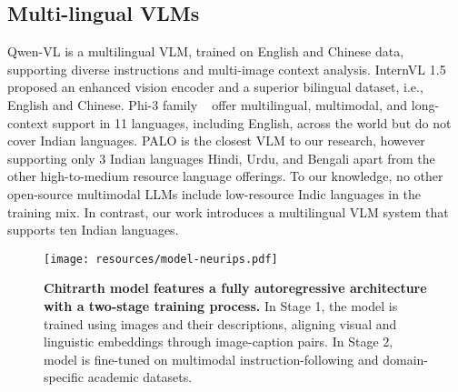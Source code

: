 \subsection{Multi-lingual VLMs}
Qwen-VL \citep{bai2023qwen} is a multilingual VLM, trained on English and Chinese data, supporting diverse instructions and multi-image context analysis. InternVL 1.5 \citep{chen2024far} proposed an enhanced vision encoder and a superior bilingual dataset, i.e., English and Chinese. Phi-3 family ~\citep{abdin2024phi} offer multilingual, multimodal, and long-context support in 11 languages, including English, across the world but do not cover Indian languages. PALO \citep{maaz2024palo} is the closest VLM to our research, however supporting only 3 Indian languages Hindi, Urdu, and Bengali apart from the other high-to-medium resource language offerings. To our knowledge, no other open-source multimodal LLMs include low-resource Indic languages in the training mix. In contrast, our work introduces a multilingual VLM system that supports ten Indian languages.




\begin{figure}[htb]
\begin{minipage}[b]{1.0\linewidth}
  \centering
\centerline{\texttt{[image: resources/model-neurips.pdf]}}
\end{minipage}
\caption{\textbf{Chitrarth model features a fully autoregressive architecture with a two-stage training process.} In Stage 1, the model is trained using images and their descriptions, aligning visual and linguistic embeddings through image-caption pairs. In Stage 2, model is fine-tuned on multimodal instruction-following and domain-specific academic datasets.}
\label{fig:model}
\end{figure}